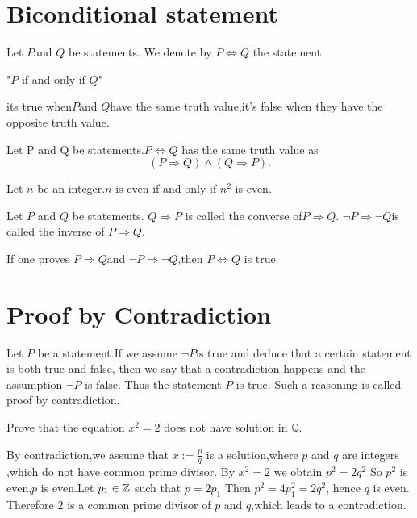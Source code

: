 \documentclass{book}
\numberwithin{equation}{section}
\begin{document}
\section{Biconditional statement}
\begin{definitionenv}
    Let $P$and $Q$ be statements. We denote by $P\Leftrightarrow Q$ the statement
    \begin{center}
        "$P$ if and only if $Q$"
    \end{center}
    its true when$P$and $Q$have the same truth value,it's false when they have the opposite truth value.
\end{definitionenv}
\begin{propositionenv}
    Let P and Q be statements.$P \Leftrightarrow Q$ has the same truth value as 
    $$(P\Rightarrow Q)\wedge (Q\Rightarrow P).$$
\end{propositionenv}
\begin{exampleenv}
    Let $n$ be an integer.$n$ is even if and only if $n^2$ is even.
\end{exampleenv}
\begin{definitionenv}
    Let $P$ and $Q$ be statements.
    \newline
    $Q\Rightarrow P$ is called the converse of$P\Rightarrow Q$.
    \newline
    $\neg P \Rightarrow \neg Q$is called the inverse of $P\Rightarrow Q$.
\end{definitionenv}
\begin{remark}
    If one proves $P\Rightarrow Q$and $\neg P\Rightarrow \neg Q$,then $P \Leftrightarrow Q$ is true.
\end{remark}




\section{Proof by Contradiction}
\begin{definitionenv}
    Let $P$ be a statement.If we assume $\neg P$is true and deduce that a certain statement is both true and false, then we say that a contradiction happens and the assumption $\neg P$ is false. Thus the statement $P$ is true. Such a reasoning is called proof by contradiction.
\end{definitionenv}
\begin{exampleenv}
    Prove that the equation $x^2=2$ does not have solution in $\mathbb{Q}$.
    \begin{proofenv}
        By contradiction,we assume that $x:=\frac{p}{q}$ is a solution,where $p$ and $q$ are integers ,which do not have common prime divisor. By $x^2=2$ we obtain $p^2=2q^2$
        So $p^2$ is even,$p$ is even.Let $p_1\in \mathbb{Z}$ such that $p=2p_1$
        Then $p^2=4p_1^2=2q^2$, hence $q$ is even. Therefore $2$ is a common prime divisor of $p$ and $q$,which leads to a contradiction.
    \end{proofenv}
\end{exampleenv}
\end{document}
